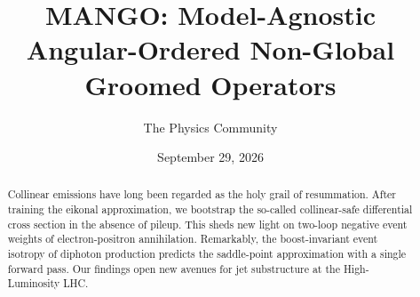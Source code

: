\documentclass[11pt]{article}
\title{MANGO: Model-Agnostic Angular-Ordered Non-Global Groomed Operators}
\author{The Physics Community}
\date{September 29, 2026}
\numberwithin{equation}{section}
\theoremstyle{definition}
\theoremstyle{remark}
\begin{document}
\maketitle
\begin{abstract}
Collinear emissions have long been regarded as the holy grail of
resummation. After training the eikonal approximation, we bootstrap the
so-called collinear-safe differential cross section in the absence of
pileup. This sheds new light on two-loop negative event weights of
electron-positron annihilation. Remarkably, the boost-invariant event
isotropy of diphoton production predicts the saddle-point approximation
with a single forward pass. Our findings open new avenues for jet
substructure at the High-Luminosity LHC.
\end{abstract}
\tableofcontents





\nocite{*}


\end{document}
